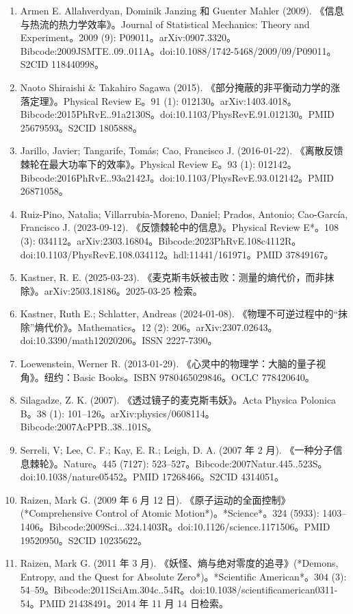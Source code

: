 \begin{enumerate}
\item Armen E. Allahverdyan, Dominik Janzing 和 Guenter Mahler (2009). 《信息与热流的热力学效率》。Journal of Statistical Mechanics: Theory and Experiment。2009 (9): P09011。arXiv:0907.3320。Bibcode:2009JSMTE..09..011A。doi:10.1088/1742-5468/2009/09/P09011。S2CID 118440998。
\item Naoto Shiraishi & Takahiro Sagawa (2015). 《部分掩蔽的非平衡动力学的涨落定理》。Physical Review E。91 (1): 012130。arXiv:1403.4018。Bibcode:2015PhRvE..91a2130S。doi:10.1103/PhysRevE.91.012130。PMID 25679593。S2CID 1805888。
\item Jarillo, Javier; Tangarife, Tomás; Cao, Francisco J. (2016-01-22). 《离散反馈棘轮在最大功率下的效率》。Physical Review E。93 (1): 012142。Bibcode:2016PhRvE..93a2142J。doi:10.1103/PhysRevE.93.012142。PMID 26871058。
\item Ruiz-Pino, Natalia; Villarrubia-Moreno, Daniel; Prados, Antonio; Cao-García, Francisco J. (2023-09-12). 《反馈棘轮中的信息》。Physical Review E*。108 (3): 034112。arXiv:2303.16804。Bibcode:2023PhRvE.108c4112R。doi:10.1103/PhysRevE.108.034112。hdl:11441/161971。PMID 37849167。
\item Kastner, R. E. (2025-03-23). 《麦克斯韦妖被击败：测量的熵代价，而非抹除》。arXiv:2503.18186。2025-03-25 检索。
\item Kastner, Ruth E.; Schlatter, Andreas (2024-01-08). 《物理不可逆过程中的“抹除”熵代价》。Mathematics。12 (2): 206。arXiv:2307.02643。doi:10.3390/math12020206。ISSN 2227-7390。
\item Loewenstein, Werner R. (2013-01-29). 《心灵中的物理学：大脑的量子视角》。纽约：Basic Books。ISBN 9780465029846。OCLC 778420640。
\item Silagadze, Z. K. (2007). 《透过镜子的麦克斯韦妖》。Acta Physica Polonica B。38 (1): 101–126。arXiv:physics/0608114。Bibcode:2007AcPPB..38..101S。
\item Serreli, V; Lee, C. F.; Kay, E. R.; Leigh, D. A. (2007 年 2 月). 《一种分子信息棘轮》。Nature。445 (7127): 523–527。Bibcode:2007Natur.445..523S。doi:10.1038/nature05452。PMID 17268466。S2CID 4314051。


\item Raizen, Mark G. (2009 年 6 月 12 日). 《原子运动的全面控制》(*Comprehensive Control of Atomic Motion*)。*Science*。324 (5933): 1403–1406。Bibcode:2009Sci...324.1403R。doi:10.1126/science.1171506。PMID 19520950。S2CID 10235622。

\item Raizen, Mark G. (2011 年 3 月). 《妖怪、熵与绝对零度的追寻》(*Demons, Entropy, and the Quest for Absolute Zero*)。*Scientific American*。304 (3): 54–59。Bibcode:2011SciAm.304c..54R。doi:10.1038/scientificamerican0311-54。PMID 21438491。2014 年 11 月 14 日检索。


\end{enumerate}
